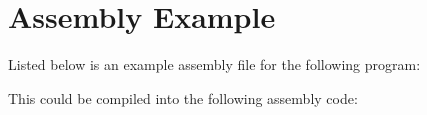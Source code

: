 \chapter{Assembly Example}
\label{appendix:asm_example}



Listed below is an example assembly file for the following \civic{} program:




\newpage

This could be compiled into the following assembly code:


